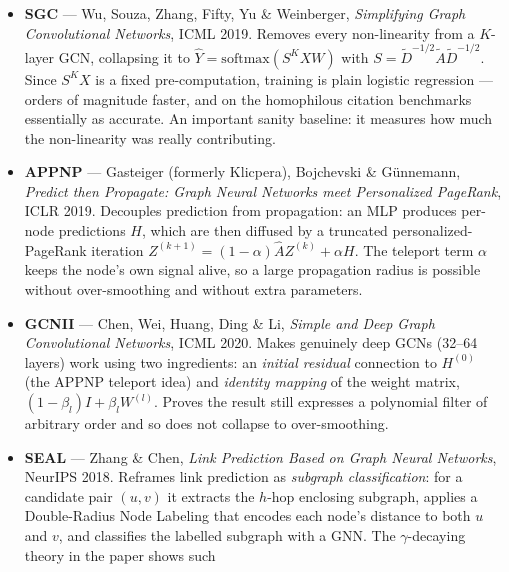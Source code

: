 \begin{itemize}[label=$\bullet$,leftmargin=1.3em]
        max aggregation lose information; a \emph{sum} aggregator with an MLP update,
        $h_v^{(l+1)}=\mathrm{MLP}\bigl((1+\epsilon)h_v^{(l)}+\sum_{u\in\mathcal{N}(v)}h_u^{(l)}\bigr)$,
        is maximally expressive, i.e.\ as strong as 1-WL. The reference point for all
        expressive-power arguments.
  \item \textbf{SGC} --- Wu, Souza, Zhang, Fifty, Yu \& Weinberger, \emph{Simplifying Graph
        Convolutional Networks}, ICML 2019.
        Removes every non-linearity from a $K$-layer GCN, collapsing it to
        $\hat{Y}=\mathrm{softmax}(S^K X W)$ with $S=\tilde{D}^{-1/2}\tilde{A}\tilde{D}^{-1/2}$.
        Since $S^KX$ is a fixed pre-computation, training is plain logistic regression ---
        orders of magnitude faster, and on the homophilous citation benchmarks essentially
        as accurate. An important sanity baseline: it measures how much the non-linearity
        was really contributing.
  \item \textbf{APPNP} --- Gasteiger (formerly Klicpera), Bojchevski \& G\"unnemann,
        \emph{Predict then Propagate: Graph Neural Networks meet Personalized PageRank},
        ICLR 2019.
        Decouples prediction from propagation: an MLP produces per-node predictions $H$,
        which are then diffused by a truncated personalized-PageRank iteration
        $Z^{(k+1)} = (1-\alpha)\hat{A}Z^{(k)} + \alpha H$. The teleport term $\alpha$ keeps
        the node's own signal alive, so a large propagation radius is possible without
        over-smoothing and without extra parameters.
  \item \textbf{GCNII} --- Chen, Wei, Huang, Ding \& Li, \emph{Simple and Deep Graph
        Convolutional Networks}, ICML 2020.
        Makes genuinely deep GCNs (32--64 layers) work using two ingredients: an
        \emph{initial residual} connection to $H^{(0)}$ (the APPNP teleport idea) and
        \emph{identity mapping} of the weight matrix, $(1-\beta_l)I + \beta_l W^{(l)}$.
        Proves the result still expresses a polynomial filter of arbitrary order and so
        does not collapse to over-smoothing.
  \item \textbf{SEAL} --- Zhang \& Chen, \emph{Link Prediction Based on Graph Neural
        Networks}, NeurIPS 2018.
        Reframes link prediction as \emph{subgraph classification}: for a candidate pair
        $(u,v)$ it extracts the $h$-hop enclosing subgraph, applies a Double-Radius Node
        Labeling that encodes each node's distance to both $u$ and $v$, and classifies the
        labelled subgraph with a GNN. The $\gamma$-decaying theory in the paper shows such

\end{itemize}
